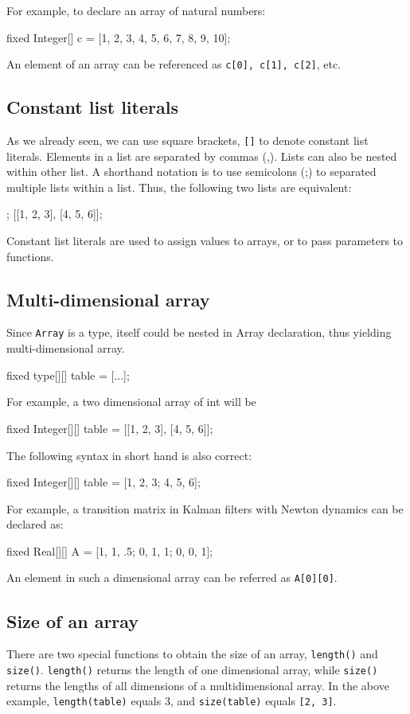 \documentclass[12pt]{article}
\renewcommand{\optional}[1]{#1} %
\begin{document}
For example, to declare an array of natural numbers:
\begin{blogcode}
fixed Integer[] c = [1, 2, 3, 4, 5, 6, 7, 8, 9, 10];
\end{blogcode}

An element of an array can be referenced as \verb|c[0], c[1], c[2]|, etc.

\subsection{Constant list literals}
As we already seen, we can use square brackets, \texttt{[]} to denote constant list literals.
Elements in a list are separated by commas (,). Lists can also be nested within other list. A shorthand notation is to use semicolons (;) to separated multiple lists within a list.
Thus, the following two lists are equivalent:
\begin{blogcode}
[1, 2, 3; 4, 5, 6];
[[1, 2, 3], [4, 5, 6]];
\end{blogcode}

Constant list literals are used to assign values to arrays, or to pass parameters to functions.

\subsection{Multi-dimensional array}
Since \texttt{Array} is a type, itself could be nested in Array declaration, thus yielding multi-dimensional array. 
\begin{blogcode}
fixed type[][] table = [...];
\end{blogcode}

For example, a two dimensional array of int will be
\begin{blogcode}
fixed Integer[][] table = [[1, 2, 3], [4, 5, 6]];
\end{blogcode}
The following syntax in short hand is also correct:
\begin{blogcode}
fixed Integer[][] table = [1, 2, 3; 4, 5, 6];
\end{blogcode}


For example, a transition matrix in Kalman  filters with Newton dynamics can be declared as:
\begin{blogcode}
fixed Real[][] A = [1, 1, .5; 0, 1, 1; 0, 0, 1];
\end{blogcode}
An element in such a dimensional array can be referred as \texttt{A[0][0]}.

\optional{
\subsection{Size of an array}
There are two special functions to obtain the size of an array, \texttt{length(\mycdot)} and \texttt{size(\mycdot)}.
\texttt{length(\mycdot)} returns the length of one dimensional array, while \texttt{size(\mycdot)} returns the lengths of all dimensions
of a multidimensional array.  In the above example, \texttt{length(table)} equals 3, and \texttt{size(table)} equals \texttt{[2, 3]}.
}
\end{document}
